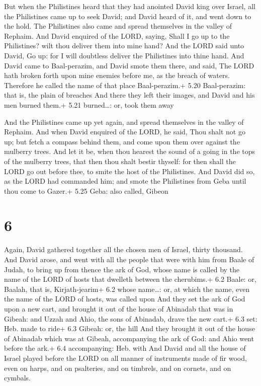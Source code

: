 But when the Philistines heard that they had anointed
David king over Israel, all the Philistines came up to seek David; and
David heard of it, and went down to the hold.  The
Philistines also came and spread themselves in the valley of Rephaim.
 And David enquired of the LORD, saying, Shall I go up to
the Philistines? wilt thou deliver them into mine hand? And the LORD
said unto David, Go up: for I will doubtless deliver the Philistines
into thine hand.  And David came to Baal-perazim, and David
smote them there, and said, The LORD hath broken forth upon mine enemies
before me, as the breach of waters. Therefore he called the name of that
place Baal-perazim.+ 5.20 Baal-perazim: that is, the plain of breaches
 And there they left their images, and David and his men
burned them.+ 5.21 burned\ldots: or, took them away

 And the Philistines came up yet again, and spread
themselves in the valley of Rephaim.  And when David
enquired of the LORD, he said, Thou shalt not go up; but fetch a compass
behind them, and come upon them over against the mulberry trees.
 And let it be, when thou hearest the sound of a going in
the tops of the mulberry trees, that then thou shalt bestir thyself: for
then shall the LORD go out before thee, to smite the host of the
Philistines.  And David did so, as the LORD had commanded
him; and smote the Philistines from Geba until thou come to Gazer.+ 5.25
Geba: also called, Gibeon

\hypertarget{section-5}{%
\section{6}\label{section-5}}

 Again, David gathered together all the chosen men of
Israel, thirty thousand.  And David arose, and went with all
the people that were with him from Baale of Judah, to bring up from
thence the ark of God, whose name is called by the name of the LORD of
hosts that dwelleth between the cherubims.+ 6.2 Baale: or, Baalah, that
is, Kirjath-jearim+ 6.2 whose name\ldots: or, at which the name, even
the name of the LORD of hosts, was called upon  And they set
the ark of God upon a new cart, and brought it out of the house of
Abinadab that was in Gibeah: and Uzzah and Ahio, the sons of Abinadab,
drave the new cart.+ 6.3 set: Heb. made to ride+ 6.3 Gibeah: or, the
hill  And they brought it out of the house of Abinadab which
was at Gibeah, accompanying the ark of God: and Ahio went before the
ark.+ 6.4 accompanying: Heb. with  And David and all the
house of Israel played before the LORD on all manner of instruments made
of fir wood, even on harps, and on psalteries, and on timbrels, and on
cornets, and on cymbals.

